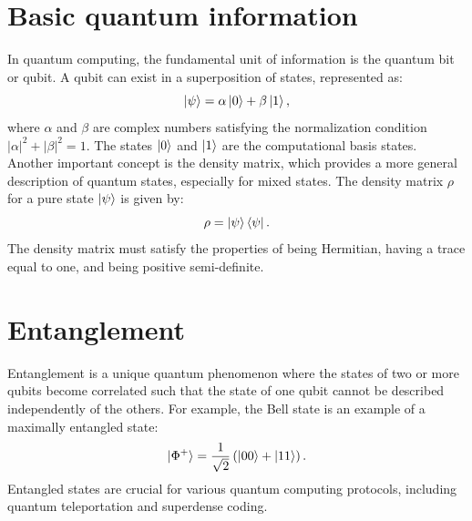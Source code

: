 \documentclass[10pt,article]{IEEEtran}
\begin{document}
\section{Basic quantum information}
In quantum computing, the fundamental unit of information is the quantum bit or qubit. A qubit can exist in a superposition of states, represented as:
\begin{equation}
  \ket{\psi} = \alpha\ket{0} + \beta\ket{1},
  \label{eq:qubit_state}
\end{equation}
where \(\alpha\) and \(\beta\) are complex numbers satisfying the normalization condition \(|\alpha|^2 + |\beta|^2 = 1\). 
The states \(\ket{0}\) and \(\ket{1}\) are the computational basis states.
Another important concept is the density matrix, which provides a more general description of quantum states, especially for mixed states. The density matrix \(\rho\) for a pure state \(\ket{\psi}\) is given by:
\begin{equation}
  \rho = \ket{\psi}\bra{\psi}.
  \label{eq:density_matrix}
\end{equation}
The density matrix must satisfy the properties of being Hermitian, having a trace equal to one, and being positive semi-definite.
\section{Entanglement}
Entanglement is a unique quantum phenomenon where the states of two or more qubits become correlated such that the state of one qubit cannot be described independently of the others. For example, the Bell state is an example of a maximally entangled state:
\begin{equation}
  \ket{\Phi^+} = \frac{1}{\sqrt{2}}\left(\ket{00} + \ket{11}\right).
  \label{eq:bell_state}
\end{equation}
Entangled states are crucial for various quantum computing protocols, including quantum teleportation and superdense coding.    
\end{document}

